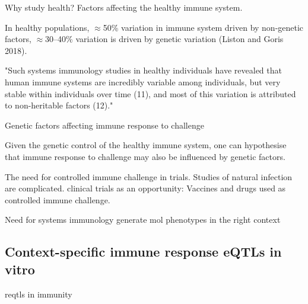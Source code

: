 \begin{outline}
    Why study health?
    Factors affecting the healthy immune system.

    In healthy populations, $\approx$50\% variation in immune system driven by non-genetic factors, $\approx$30–40\% variation is driven by genetic variation (Liston and Goris 2018).

    "Such systems  immunology studies in  healthy individuals have  revealed that human immune  systems are incredibly  variable among individuals,  but very stable within  individuals over time (11),  and most of this variation is  attributed to non-heritable  factors (12)."

Genetic factors affecting immune response to challenge

    Given the genetic control of the healthy immune system, one can hypothesise that immune response to challenge may also be influenced by genetic factors.

    The need for controlled immune challenge in trials.
    Studies of natural infection are complicated.
    clinical trials as an opportunity: 
        Vaccines and drugs used as controlled immune challenge.

Need for systems immunology
    generate mol phenotypes 
    in the right context

\subsection{Context-specific immune response eQTLs in vitro}


reqtls in immunity


\end{outline}
